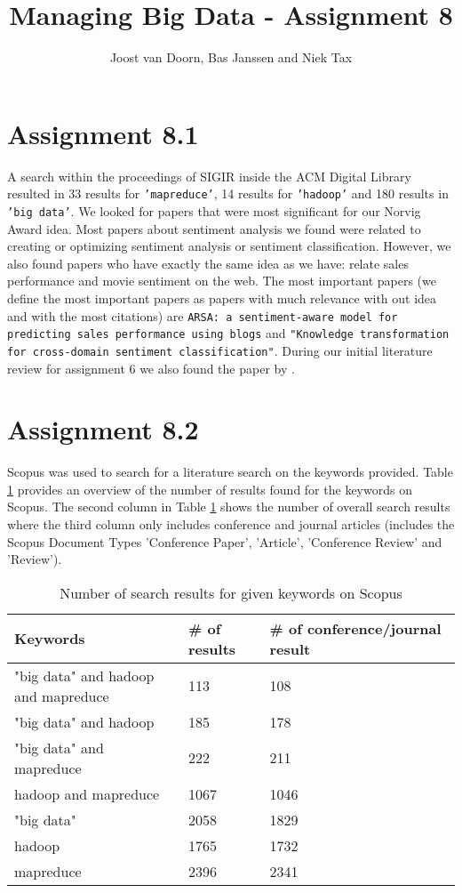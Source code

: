 \documentclass[]{article}
\title{Managing Big Data - Assignment 8}
\author{Joost van Doorn, Bas Janssen and Niek Tax}
\begin{document}
\maketitle

\section*{Assignment 8.1}
A search within the proceedings of SIGIR inside the ACM Digital Library resulted in 33 results for \texttt{'mapreduce'}, 14 results for \texttt{'hadoop'} and 180 results in \texttt{'big data'}. We looked for papers that were most significant for our Norvig Award idea. Most papers about sentiment analysis we found were related to creating or optimizing sentiment analysis or sentiment classification. However, we also found papers who have exactly the same idea as we have: relate sales performance and movie sentiment on the web. The most important papers (we define the most important papers as papers with much relevance with out idea and with the most citations) are \texttt{ARSA: a sentiment-aware model for predicting sales performance using blogs}\cite{Liu2007} and \texttt{"Knowledge transformation for cross-domain sentiment classification"}\cite{Li2009}. During our initial literature review for assignment 6 we also found the paper by \cite{Liu2007}.

\section*{Assignment 8.2}
Scopus was used to search for a literature search on the keywords provided. Table \ref{tab:scopus_search} provides an overview of the number of results found for the keywords on Scopus. The second column in Table \ref{tab:scopus_search} shows the number of overall search results where the third column only includes conference and journal articles (includes the Scopus Document Types 'Conference Paper', 'Article', 'Conference Review' and 'Review').  
\begin{table}
\begin{tabular}{l|l|l}
Keywords & \# of results & \# of conference/journal result \\
\hline
"big data" and hadoop and mapreduce & 113 & 108\\ 
"big data" and hadoop & 185 & 178\\ 
"big data" and mapreduce & 222 & 211\\ 
hadoop and mapreduce & 1067 & 1046\\ 
"big data" & 2058 & 1829\\ 
hadoop & 1765 & 1732\\ 
mapreduce & 2396 & 2341\\ 
\end{tabular}
\caption{Number of search results for given keywords on Scopus}
\label{tab:scopus_search}
\end{table}
\end{document}
